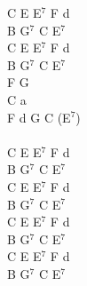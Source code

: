 \documentclass[a5paper, 10pt]{book}
\begin{document}
\begin{minipage}[t]{0.25\textwidth}
  C E E$^7$ F d\\
  B G$^7$ C E$^7$\\
  C E E$^7$ F d\\
  B G$^7$ C E$^7$\\

  F G\\
  C a\\
  F d G C (E$^7$)\\
  \\
  C E E$^7$ F d\\
  B G$^7$ C E$^7$\\
  C E E$^7$ F d\\
  B G$^7$ C E$^7$\\

  C E E$^7$ F d\\
  B G$^7$ C E$^7$\\
  C E E$^7$ F d\\
  B G$^7$ C E$^7$\\

\end{minipage}
\vfill
\end{document}
